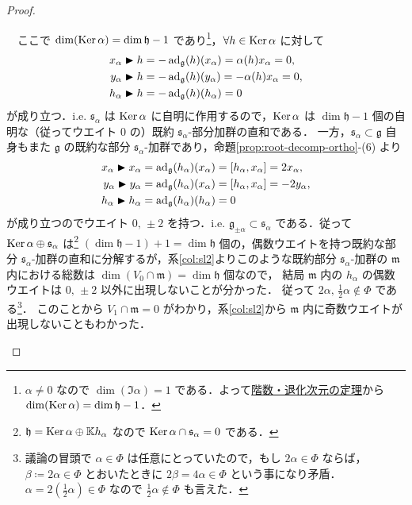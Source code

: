 \documentclass[rep_main]{subfiles}
\begin{document}
\begin{proof}
\begin{description}
		　ここで $\dim (\operatorname{Ker} \alpha) = \dim \mathfrak{h} - 1$ であり\footnote{$\alpha \neq 0$ なので $\dim (\Im \alpha) = 1$ である．よって\hyperref[col:rank-nullity]{階数・退化次元の定理}から $\dim (\operatorname{Ker} \alpha) = \dim \mathfrak{h} - 1$．}，$\forall h \in \operatorname{Ker} \alpha$ に対して
		\begin{align}
			x_\alpha \blacktriangleright h &= -\operatorname{ad}_{\mathfrak{g}}(h)(x_\alpha) = \alpha(h)x_\alpha = 0, \\
			y_\alpha \blacktriangleright h &= -\operatorname{ad}_{\mathfrak{g}}(h)(y_\alpha) = -\alpha(h)x_\alpha = 0, \\
			h_\alpha \blacktriangleright h &= -\operatorname{ad}_{\mathfrak{g}}(h)(h_\alpha) = 0
		\end{align}
		が成り立つ．i.e. $\mathfrak{s}_\alpha$ は $\operatorname{Ker} \alpha$ に自明に作用するので，$\operatorname{Ker} \alpha$ は $\dim \mathfrak{h} - 1$ 個の自明な（従ってウエイト $0$ の）既約 $\mathfrak{s}_\alpha$-部分加群の直和である．
		一方，$\mathfrak{s}_\alpha \subset \mathfrak{g}$ 自身もまた $\mathfrak{g}$ の既約な部分 $\mathfrak{s}_\alpha$-加群であり，命題\ref{prop:root-decomp-ortho}-(6) より
		\begin{align}
			x_\alpha \btr x_\alpha &= \ad_{\mathfrak{g}}(h_\alpha)(x_\alpha) = \comm{h_\alpha}{x_\alpha} = 2x_\alpha, \\
			y_\alpha \btr y_\alpha &= \ad_{\mathfrak{g}}(h_\alpha)(x_\alpha) = \comm{h_\alpha}{x_\alpha} = -2y_\alpha, \\
			h_\alpha \btr h_\alpha &= \ad_{\mathfrak{g}}(h_\alpha)(h_\alpha) = 0
		\end{align}
		が成り立つのでウエイト $0,\, \pm 2$ を持つ．i.e. $\mathfrak{g}_{\pm \alpha} \subset \mathfrak{s}_\alpha$ である．従って $\operatorname{Ker} \alpha \oplus \mathfrak{s}_\alpha$ は\footnote{$\mathfrak{h} = \operatorname{Ker} \alpha \oplus \mathbb{K}h_\alpha$ なので $\operatorname{Ker} \alpha \cap \mathfrak{s}_\alpha = 0$ である．} 
		$(\dim \mathfrak{h} - 1) + 1 = \dim \mathfrak{h}$ 個の，偶数ウエイトを持つ既約な部分 $\mathfrak{s}_\alpha$-加群の直和に分解するが，系\ref{col:sl2}よりこのような既約部分 $\mathfrak{s}_\alpha$-加群の $\mathfrak{m}$ 内における総数は $\dim (V_0 \cap \mathfrak{m}) = \dim \mathfrak{h}$ 個なので，
		結局 $\mathfrak{m}$ 内の $h_\alpha$ の偶数ウエイトは $0,\, \pm 2$ 以外に出現しないことが分かった．
		従って $2\alpha,\, \frac{1}{2}\alpha \notin \Phi$ である\footnote{議論の冒頭で $\alpha \in \Phi$ は任意にとっていたので，もし $2\alpha \in \Phi$ ならば，$\beta \coloneqq 2\alpha \in \Phi$ とおいたときに $2\beta = 4\alpha \in \Phi$ という事になり矛盾．$\alpha = 2 (\frac{1}{2}\alpha) \in \Phi$ なので $\frac{1}{2}\alpha \notin \Phi$ も言えた．}．
		このことから $V_1 \cap \mathfrak{m} = 0$ がわかり，系\ref{col:sl2}から $\mathfrak{m}$ 内に奇数ウエイトが出現しないこともわかった．

\end{description}
\end{proof}
\end{document}
